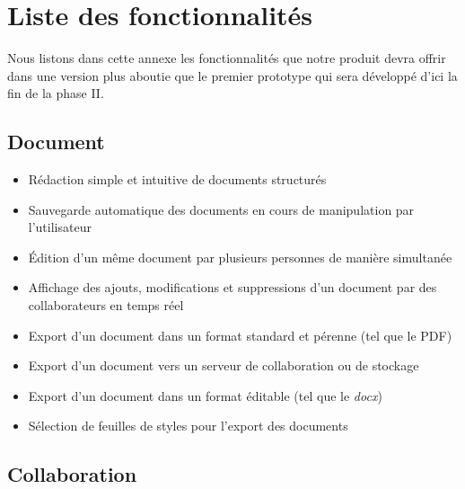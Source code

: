 \documentclass[10pt,twocolumn,a4paper,utf8x]{article}
\begin{document}
\section{Liste des fonctionnalités}
Nous listons dans cette annexe les fonctionnalités que notre produit
devra offrir dans une version plus aboutie que le premier prototype qui
sera développé d'ici la fin de la phase II.

\subsection{Document}

\begin{itemize}
\itemsep1pt\parskip0pt
\item
  Rédaction simple et intuitive de documents structurés
\item
  Sauvegarde automatique des documents en cours de manipulation par
  l'utilisateur
\item
  Édition d'un même document par plusieurs personnes de manière
  simultanée
\item
  Affichage des ajouts, modifications et suppressions d'un document par
  des collaborateurs en temps réel
\item
  Export d'un document dans un format standard et pérenne (tel que le
  PDF)
\item
  Export d'un document vers un serveur de collaboration ou de stockage
\item
  Export d'un document dans un format éditable (tel que le \emph{docx})
\item
  Sélection de feuilles de styles pour l'export des documents
\end{itemize}

\subsection{Collaboration}
\end{document}
